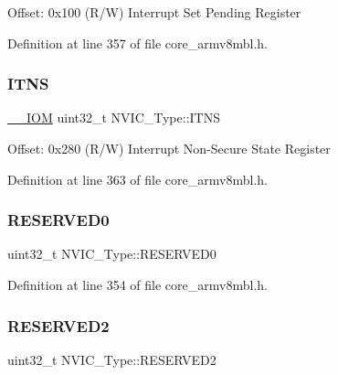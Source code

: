 Offset\+: 0x100 (R/W) Interrupt Set Pending Register 

Definition at line 357 of file core\+\_\+armv8mbl.\+h.

\mbox{\label{struct_n_v_i_c___type_a4940c96f11d1c95d95a28e388f04d6d6}} 
\subsubsection{\texorpdfstring{I\+T\+NS}{ITNS}}
{\footnotesize\ttfamily \hyperlink{core__sc300_8h_ab6caba5853a60a17e8e04499b52bf691}{\+\_\+\+\_\+\+I\+OM} uint32\+\_\+t N\+V\+I\+C\+\_\+\+Type\+::\+I\+T\+NS}

Offset\+: 0x280 (R/W) Interrupt Non-\/\+Secure State Register 

Definition at line 363 of file core\+\_\+armv8mbl.\+h.

\mbox{\label{struct_n_v_i_c___type_a114b23ee6f1540603908adaedaecc477}} 
\subsubsection{\texorpdfstring{R\+E\+S\+E\+R\+V\+E\+D0}{RESERVED0}}
{\footnotesize\ttfamily uint32\+\_\+t N\+V\+I\+C\+\_\+\+Type\+::\+R\+E\+S\+E\+R\+V\+E\+D0}



Definition at line 354 of file core\+\_\+armv8mbl.\+h.

\mbox{\label{struct_n_v_i_c___type_a8ed6bf06e09e4ebc57e591fde22c70c3}} 
\subsubsection{\texorpdfstring{R\+E\+S\+E\+R\+V\+E\+D2}{RESERVED2}}
{\footnotesize\ttfamily uint32\+\_\+t N\+V\+I\+C\+\_\+\+Type\+::\+R\+E\+S\+E\+R\+V\+E\+D2}



